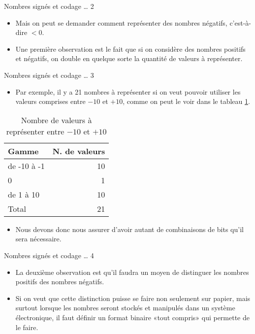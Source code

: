 \documentclass[presentation]{beamer}
\begin{document}
\begin{frame}[label={sec:org1a1266b}]{Nombres signés et codage \ldots{} 2}
\begin{itemize}
\item Mais on peut se demander comment représenter des nombres négatifs, c'est-à-dire \(< 0\).

\item Une première observation est le fait que si on considère des nombres positifs \alert{et} négatifs, on double en quelque sorte la quantité de valeurs à représenter.
\end{itemize}
\end{frame}

\begin{frame}[label={sec:orgd64cdc6}]{Nombres signés et codage \ldots{} 3}
\begin{itemize}
\item Par exemple, il y a 21 nombres à représenter si on veut pouvoir utiliser les valeurs comprises entre \(-10\) et \(+10\), comme on peut le voir dans le tableau \ref{tab:orgaa83a6d}.
\end{itemize}

\begin{table}[htbp]
\caption{\label{tab:orgaa83a6d}Nombre de valeurs à représenter entre \(-10\) et \(+10\)}
\centering
\begin{tabular}{lr}
Gamme & N. de valeurs\\[0pt]
\hline
de -10 à -1 & 10\\[0pt]
0 & 1\\[0pt]
de 1 à 10 & 10\\[0pt]
\hline
Total & 21\\[0pt]
\end{tabular}
\end{table}

\begin{itemize}
\item Nous devons donc nous assurer d'avoir autant de combinaisons de bits qu'il sera nécessaire.
\end{itemize}
\end{frame}

\begin{frame}[label={sec:orgdf37a83}]{Nombres signés et codage \ldots{} 4}
\begin{itemize}
\item La deuxième observation est qu'il faudra un moyen de distinguer les nombres positifs des nombres négatifs.

\item Si on veut que cette distinction puisse se faire non seulement sur papier, mais surtout lorsque les nombres seront stockés et manipulés dans un système électronique, il faut définir un format binaire «tout compris» qui permette de le faire.
\end{itemize}
\end{frame}
\end{document}

